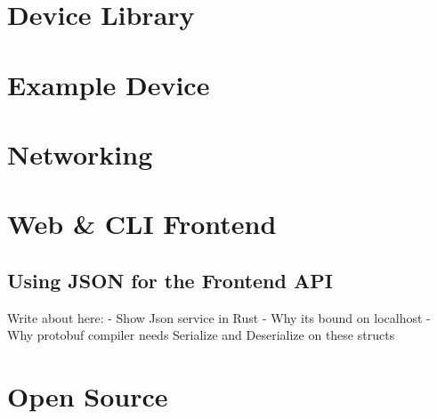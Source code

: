 \section{Device Library} \label{sec:chap3:devicelib}
\section{Example Device} \label{sec:chap3:deviceexample}
\section{Networking}

\section{Web \& CLI Frontend} \label{sec:chap3:frontend}
\subsection{Using JSON for the Frontend API} \label{sec:chap3:frontend:json}
Write about here:
- Show Json service in Rust
- Why its bound on localhost
- Why protobuf compiler needs Serialize and Deserialize on these structs
\section{Open Source} \label{sec:chap3:opensource}
